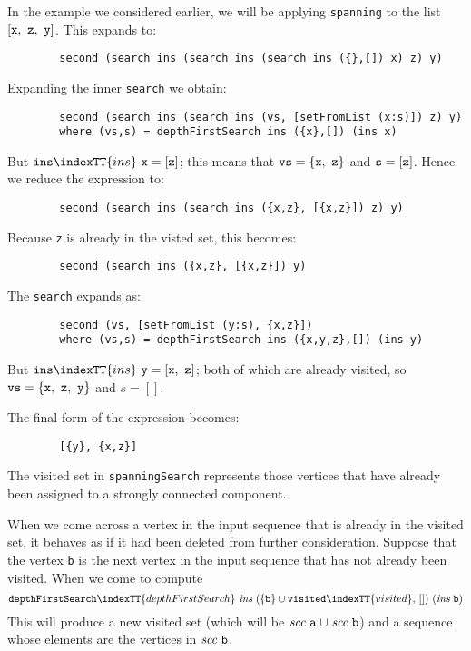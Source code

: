 In the example we considered earlier, we will be applying \mbox{\tt spanning}
to the list $[\mbox{\tt x},~\mbox{\tt z},~\mbox{\tt y}]$. This expands to:
\begin{verbatim}
        second (search ins (search ins (search ins ({},[]) x) z) y)
\end{verbatim}
Expanding the inner \mbox{\tt search} we obtain:
\begin{verbatim}
        second (search ins (search ins (vs, [setFromList (x:s)]) z) y)
        where (vs,s) = depthFirstSearch ins ({x},[]) (ins x)
\end{verbatim}
But $\mbox{\tt ins}\indexTT{ins}~\mbox{\tt x} = [\mbox{\tt z}]$; this means that $\mbox{\tt vs} = \{\mbox{\tt x},~\mbox{\tt z}\}$ and
$\mbox{\tt s} = [\mbox{\tt z}]$. Hence we reduce the expression to:
\begin{verbatim}
        second (search ins (search ins ({x,z}, [{x,z}]) z) y)
\end{verbatim}
Because \mbox{\tt z} is already in the visted set, this becomes:
\begin{verbatim}
        second (search ins ({x,z}, [{x,z}]) y)
\end{verbatim}
The \mbox{\tt search} expands as:
\begin{verbatim}
        second (vs, [setFromList (y:s), {x,z}])
        where (vs,s) = depthFirstSearch ins ({x,y,z},[]) (ins y)
\end{verbatim}
But $\mbox{\tt ins}\indexTT{ins}~\mbox{\tt y} = [\mbox{\tt x},~\mbox{\tt z}]$; both of which are already visited, so
$\mbox{\tt vs} = \{\mbox{\tt x},~\mbox{\tt z},~\mbox{\tt y}\}$ and $s = []$.

The final form of the expression becomes:
\begin{verbatim}
        [{y}, {x,z}]
\end{verbatim}
\begin{important}
The visited set in \mbox{\tt spanningSearch} represents those vertices that
have already been assigned to a strongly connected component.
\end{important}

When we come across a vertex in the input sequence that is already in
the visited set, it behaves as if it had been deleted from further
consideration. Suppose that the vertex \mbox{\tt b} is the next vertex in the
input sequence that has not already been visited. When we come to
compute
\[
 \mbox{\tt depthFirstSearch}\indexTT{depthFirstSearch}~ \mbox{\it ins}~
  (\{\mbox{\tt b}\}\cup \mbox{\tt visited}\indexTT{visited},\,[])~ (\mbox{\it ins}~\mbox{\tt b})
\]
This will produce a new visited set (which will be $\mbox{\it scc}~\mbox{\tt a}
\mathrel{\cup} \mbox{\it scc}~\mbox{\tt b}$) and a sequence whose elements are
the vertices in $\mbox{\it scc}~\mbox{\tt b}$.

